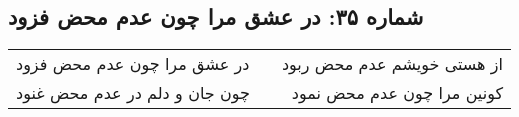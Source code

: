 \begin{center}
\section*{شماره ۳۵: در عشق مرا چون عدم محض فزود}
\label{sec:035}
\begin{longtable}{l p{0.5cm} r}
در عشق مرا چون عدم محض فزود
&&
از هستی خویشم عدم محض ربود
\\
چون جان و دلم در عدم محض غنود
&&
کونین مرا چون عدم محض نمود
\\
\end{longtable}
\end{center}

